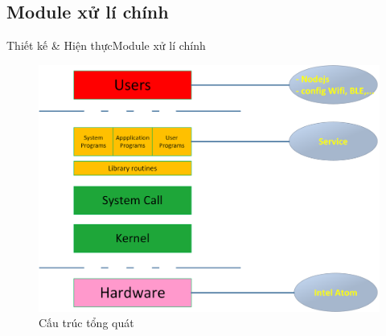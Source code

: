 \documentclass[compress, blue, 13pt,hyperref={pdfpagemode=FullScreen}]{beamer}
\begin{document}
\subsection{Module xử lí chính}
\begin{frame}{Thiết kế \& Hiện thực}{Module xử lí chính}
\begin{figure}[hbtp]
\centering
\includegraphics[scale=0.4]{images/architecture_os.png}
\caption{Cấu trúc tổng quát}
\end{figure}
\end{frame}
\end{document}
